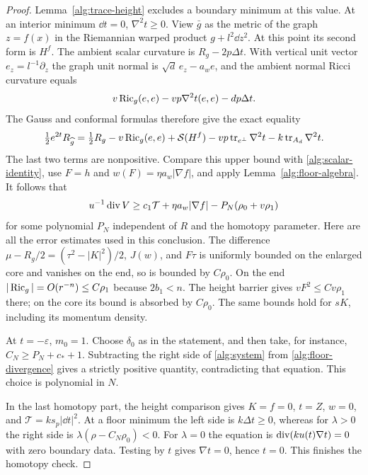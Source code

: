 \begin{proof}
Lemma~\ref{alg:trace-height} excludes a boundary minimum at this value.
At an interior minimum $\dd t=0$, $\nabla^2t\geq0$.  View $\bar g$
as the metric of the graph $z=f(x)$ in the Riemannian warped product
$g+l^2\dd z^2$.  At this point its second form is $H^f$.  The ambient
scalar curvature is $R_g-2p\Delta t$.  With vertical unit vector
$e_z=l^{-1}\partial_z$ the graph unit normal is
$\sqrt d\,e_z-a_we$, and the ambient normal Ricci curvature equals
\[
 v\operatorname{Ric}_g(e,e)-vp\nabla^2t(e,e)-dp\Delta t.
\]
The Gauss and conformal formulas therefore give the exact equality
\begin{equation}
 \tfrac12 e^{2t}R_{\widehat g}
 =\tfrac12R_g-v\operatorname{Ric}_g(e,e)+\mathcal S(H^f)
 -vp\operatorname{tr}_{e^\perp}\nabla^2t-k\operatorname{tr}_{A_d}\nabla^2t.
 \label{alg:floor-gauss}
\end{equation}
The last two terms are nonpositive.  Compare this upper bound with
\eqref{alg:scalar-identity}, use $F=h$ and
$w(F)=\eta a_w|\nabla f|$, and apply
Lemma~\ref{alg:floor-algebra}.  It follows that
\begin{equation}
 u^{-1}\operatorname{div} V
 \geq c_1\mathcal T+\eta a_w|\nabla f|
                  -P_N(\rho_0+v\rho_1)
 \label{alg:floor-divergence}
\end{equation}
for some polynomial $P_N$ independent of $R$ and the homotopy parameter.
Here are all the error estimates used in this conclusion.  The difference
$\mu-R_g/2=(\tau^2-|K|^2)/2$, $J(w)$, and $F\tau$ is uniformly
bounded on the enlarged core and vanishes on the end, so is bounded by
$C\rho_0$.  On the end $|\operatorname{Ric}_g|=O(r^{-n})\leq C\rho_1$ because
$2b_1<n$.  The height barrier gives $vF^2\leq Cv\rho_1$ there;
on the core its bound is absorbed by $C\rho_0$.  The same bounds hold
for $sK$, including its momentum density.

At $t=-\varepsilon$, $m_0=1$.  Choose $\delta_0$ as in the statement,
and then take, for instance, $C_N\geq P_N+c_*+1$.
Subtracting the right side of \eqref{alg:system} from
\eqref{alg:floor-divergence} gives a strictly positive quantity,
contradicting that equation.  This choice is polynomial in $N$.

In the last homotopy part, the height comparison gives $K=f=0$,
$t=Z$, $w=0$, and $\mathcal T=ks_p|\dd t|^2$.  At a floor minimum
the left side is $k\Delta t\geq0$, whereas for $\lambda>0$ the
right side is $\lambda(\rho-C_N\rho_0)<0$.  For $\lambda=0$ the
equation is $\operatorname{div}(ku(t)\nabla t)=0$ with zero boundary data.
Testing by $t$ gives $\nabla t=0$, hence $t=0$.  This finishes the
homotopy check.
\end{proof}


